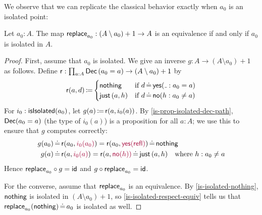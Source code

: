 We observe that we can replicate the classical behavior exactly when \( a_0 \) is an isolated point:

\begin{proposition}\label{isolated-minus-plus-equiv}
  Let \( a_0 : A \).
  The map \( \operatorname{\mathsf{replace}}_{a_0} : (A \setminus a_0) + 1 \to A \)
  is an equivalence if and only if \( a_0 \) is isolated in \( A \).
  \begin{proof}
    First, assume that \( a_0 \) is isolated.
    We give an inverse \( g : A \to (A \setminus a_0) + 1 \) as follows.
    Define \( \mathsf{r} : \prod_{a : A} \operatorname{\mathsf{Dec}}{(a_0 = a)} \to (A \setminus a_0) + 1 \)
    by
    \[
      \Op{r}(a, d) \DefEq
      \begin{cases}
        \Nothing & \text{if}\ d \JudgeEq \Op{yes}(\mathunderscore : a_0 = a) \\
        \Just{(a, h)} & \text{if}\ d \JudgeEq \Op{no}(h : a_0 \neq a)
      \end{cases}
    \]
    For \( i_0 : \operatorname{\mathsf{isIsolated}}(a_0) \), let \( g(a) \operatorname{\mathrel{\coloneq}} \mathsf{r}(a, i_0(a)) \).
    By \autoref{is-prop-isolated-dec-path}, \( \operatorname{\mathsf{Dec}}(a_0 = a) \) (the type of \( i_0(a) \)) is a proposition for all \( a : A \);
    we use this to ensure that \( g \) computes correctly:
    \begin{align*}
      g(a_0) &\JudgeEq \Op{r}(a_0, \Highlight{i_0(a_0)}) = \Op{r}(a_0, \Highlight{\Op{yes}(\Op{refl})}) \JudgeEq \Nothing \\
      g(a)   &\JudgeEq \Op{r}(a, \Highlight{i_0(a)}) = \Op{r}(a, \Highlight{\Op{no}(h))} \JudgeEq \Just{(a, h)}
        \quad \text{where}~h : a_0 \neq a
    \end{align*}
    Hence \( {\operatorname{\mathsf{replace}}_{a_0}} \circ g = \mathsf{id} \) and \( g \circ {\operatorname{\mathsf{replace}}_{a_0}} = \mathsf{id} \).

    For the converse, assume that \( \operatorname{\mathsf{replace}}_{a_0} \) is an equivalence.
    By \autoref{is-isolated-nothing}, \( \operatorname{\mathsf{nothing}} \) is isolated in \( (A \setminus a_0 ) + 1 \),
    so \autoref{is-isolated-respect-equiv} tells us that \( \operatorname{\mathsf{replace}}_{a_0}(\operatorname{\mathsf{nothing}}) \operatorname{\mathrel{\doteq}} a_0 \) is isolated as well.
  \end{proof}
\end{proposition}

